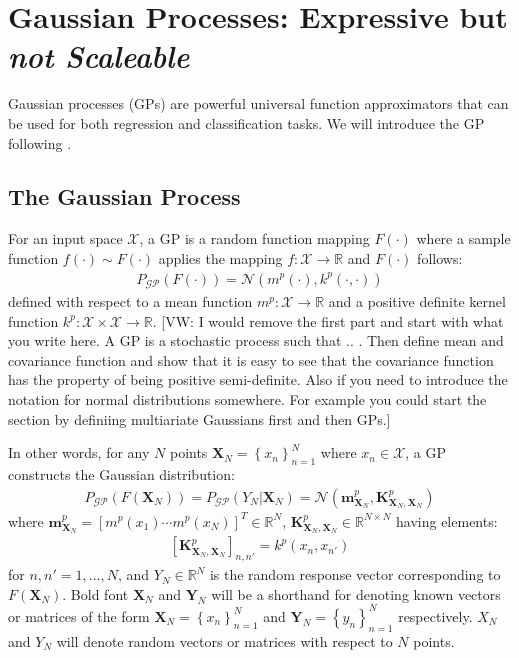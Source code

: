 \documentclass{article}
\newcommand{\vw}[1]{{\color{green} [VW: #1]}}
\newcommand{\GP}{\operatorname{\mathcal{GP}}}
\numberwithin{equation}{section}
\begin{document}
\section{Gaussian Processes: Expressive but \textit{not Scaleable}}
Gaussian processes (GPs) are powerful universal function approximators that can be used for both regression and classification tasks. We will introduce the GP following \cite{rasmussen2003gaussian}.

\subsection{The Gaussian Process}\label{section:the-gp}
For an input space $\mathcal{X}$, a GP is a random function mapping $F(\cdot)$ where a sample function $f(\cdot) \sim F(\cdot)$ applies the mapping $f: \mathcal{X} \rightarrow \mathbb{R}$ and $F(\cdot)$ follows:
\begin{align}
    P_{\GP}\left(F\left(\cdot \right)\right) =  \mathcal{N}(m^p(\cdot), k^p(\cdot, \cdot))
    \label{gp-normal}
\end{align}
defined with respect to a mean function $m^p: \mathcal{X} \rightarrow \mathbb{R}$ and a positive definite kernel function $k^p: \mathcal{X} \times \mathcal{X} \rightarrow \mathbb{R}$. \vw{I would remove the first part and start with what you write here. A GP is a stochastic process such that .. . Then define mean and covariance function and show that it is easy to see that the covariance function has the property of being positive semi-definite. Also if you need to introduce the notation for normal distributions somewhere. For example you could start the section by definiing multiariate Gaussians first and then GPs.}


In other words, for any $N$ points $\mathbf{X}_N = \left\{ x_n\right\}_{n=1}^N$ where $x_n \in \mathcal{X}$, a GP constructs the Gaussian distribution:
\begin{align}
    \label{gp-vector}
    P_{\GP}\left(F\left(\mathbf{X}_N\right)\right) = P_{\GP}\left(Y_N \vert \mathbf{X}_N\right) = \mathcal{N}\left(\mathbf{m}^p_{\mathbf{X}_N}, \mathbf{K}^{p}_{\mathbf{X}_N, \mathbf{X}_N}\right)
\end{align}
where $\mathbf{m}^p_{\mathbf{X}_N} = \left[ m^p(x_1) \cdots m^p(x_N)\right]^T \in \mathbb{R}^N$, $\mathbf{K}^p_{\mathbf{X}_N, \mathbf{X}_N} \in \mathbb{R}^{N \times N}$ having elements:
\begin{align}
    \left[\mathbf{K}^p_{\mathbf{X}_N, \mathbf{X}_N}\right]_{n, n'} = k^p(x_n, x_{n'})
\end{align}
for $n, n'=1,\dots, N$, and $Y_N \in \mathbb{R}^{N}$ is the random response vector corresponding to $F(\mathbf{X}_N)$. Bold font $\mathbf{X}_N$ and $\mathbf{Y}_N$ will be a shorthand for denoting known vectors or matrices of the form $\mathbf{X}_N = \left\{ x_n\right\}_{n=1}^N$ and $\mathbf{Y}_N = \left\{ y_n\right\}_{n=1}^N$ respectively. $X_N$ and $Y_N$ will denote random vectors or matrices with respect to $N$ points.
\end{document}
